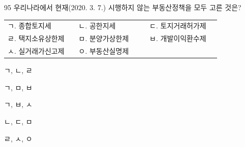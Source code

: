 \begin{question}{95}
우리나라에서 현재(2020. 3. 7.) 시행하지 않는 부동산정책을 모두 고른 것은?
\begin{framedtext}
\begin{tabular}{@{}p{0.3\linewidth}p{0.3\linewidth}p{0.3\linewidth}@{}}
ㄱ. 종합토지세 & ㄴ. 공한지세 & ㄷ. 토지거래허가제 \\
ㄹ. 택지소유상한제 & ㅁ. 분양가상한제 & ㅂ. 개발이익환수제 \\
ㅅ. 실거래가신고제 & ㅇ. 부동산실명제 & 
\end{tabular}
\end{framedtext}
\begin{choices}
  \item ㄱ, ㄴ, ㄹ
  \item ㄱ, ㅁ, ㅂ
  \item ㄱ, ㅂ, ㅅ
  \item ㄴ, ㄷ, ㅁ
  \item ㄹ, ㅅ, ㅇ
\end{choices}
\end{question}
